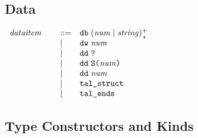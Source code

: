 \documentclass{article}
\newenvironment{gramrule}
  {\begin{flushleft}$\begin{array}{p{0.7in}ll}}
  {\end{array}$\end{flushleft}}
\newcommand{\nterm}[1]{{\it#1}}
\newcommand{\term}[1]{{\it#1}}
\newcommand{\ts}[1]{\hbox{\tt#1}}
\newcommand{\alt}{\mathrel{|}}
\begin{document}
\subsection{Data}
\begin{gramrule}
\nterm{dataitem} &::=& \ts{db} \; (\term{num}\alt\term{string})^+_{\ts{,}} \\
&|& \ts{dw} \; \term{num} \\
&|& \ts{dd} \; \ts{?} \\
&|& \ts{dd} \; \ts{S} \ts{(} \term{num} \ts{)} \\
&|& \ts{dd} \; \term{num} \\
&|& \ts{tal\_struct} \\
&|& \ts{tal\_ends}
\end{gramrule}
\subsection{Type Constructors and Kinds}
\end{document}
